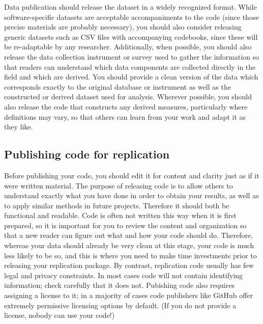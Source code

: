 Data publication should release the dataset in a widely recognized format.
While software-specific datasets are acceptable accompaniments to the code
(since those precise materials are probably necessary),
you should also consider releasing generic datasets
such as CSV files with accompanying codebooks,
since these will be re-adaptable by any researcher.
Additionally, when possible, you should also release
the data collection instrument or survey used to gather the information
so that readers can understand which data components are
collected directly in the field and which are derived.
You should provide a clean version of the data
which corresponds exactly to the original database or instrument
as well as the constructed or derived dataset used for analysis.
Wherever possible, you should also release the code
that constructs any derived measures,
particularly where definitions may vary,
so that others can learn from your work and adapt it as they like.

\subsection{Publishing code for replication}

Before publishing your code, you should edit it for content and clarity
just as if it were written material.
The purpose of releasing code is to allow others to understand
exactly what you have done in order to obtain your results,
as well as to apply similar methods in future projects.
Therefore it should both be functional and readable.
Code is often not written this way when it is first prepared,
so it is important for you to review the content and organization
so that a new reader can figure out what and how your code should do.
Therefore, whereas your data should already be very clean at this stage,
your code is much less likely to be so, and this is where you need to make
time investments prior to releasing your replication package.
By contrast, replication code usually has few legal and privacy constraints.
In most cases code will not contain identifying information;
check carefully that it does not.
Pubishing code also requires assigning a license to it;
in a majority of cases code publishers like GitHub
offer extremely permissive licensing options by default.
(If you do not provide a license, nobody can use your code!)

